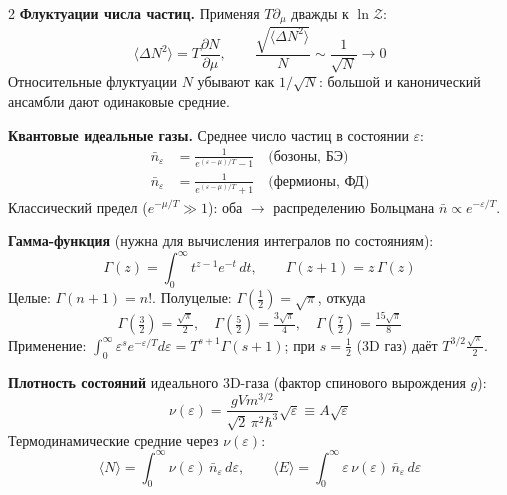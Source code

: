 \documentclass[a4paper,10pt]{article}
\begin{document}
\begin{multicols}{2}
\textbf{Флуктуации числа частиц.} Применяя $T\partial_\mu$ дважды к $\ln\mathcal{Z}$:
\begin{equation*}
    \langle\Delta N^2\rangle = T\frac{\partial N}{\partial\mu}, \qquad
    \frac{\sqrt{\langle\Delta N^2\rangle}}{N} \sim \frac{1}{\sqrt{N}} \to 0
\end{equation*}
Относительные флуктуации $N$ убывают как $1/\sqrt{N}$: большой и канонический ансамбли дают одинаковые средние.

\textbf{Квантовые идеальные газы.} Среднее число частиц в состоянии $\varepsilon$:
\begin{align*}
    \bar{n}_\varepsilon &= \frac{1}{e^{(\varepsilon-\mu)/T} - 1} \quad \text{(бозоны, БЭ)} \\[2pt]
    \bar{n}_\varepsilon &= \frac{1}{e^{(\varepsilon-\mu)/T} + 1} \quad \text{(фермионы, ФД)}
\end{align*}
Классический предел ($e^{-\mu/T} \gg 1$): оба $\to$ распределению Больцмана $\bar{n} \propto e^{-\varepsilon/T}$.

\textbf{Гамма-функция} (нужна для вычисления интегралов по состояниям):
\begin{equation*}
    \Gamma(z) = \int_0^\infty t^{z-1}e^{-t}\,dt, \qquad \Gamma(z+1) = z\,\Gamma(z)
\end{equation*}
Целые: $\Gamma(n+1)=n!$. Полуцелые: $\Gamma(\tfrac{1}{2})=\sqrt{\pi}$, откуда
\begin{equation*}
    \Gamma\!\left(\tfrac{3}{2}\right)=\tfrac{\sqrt{\pi}}{2},\quad
    \Gamma\!\left(\tfrac{5}{2}\right)=\tfrac{3\sqrt{\pi}}{4},\quad
    \Gamma\!\left(\tfrac{7}{2}\right)=\tfrac{15\sqrt{\pi}}{8}
\end{equation*}
Применение: $\displaystyle\int_0^\infty \varepsilon^s e^{-\varepsilon/T}d\varepsilon = T^{s+1}\Gamma(s+1)$; при $s=\tfrac{1}{2}$ (3D газ) даёт $T^{3/2}\tfrac{\sqrt{\pi}}{2}$.

\textbf{Плотность состояний} идеального 3D-газа (фактор спинового вырождения $g$):
\begin{equation*}
    \nu(\varepsilon) = \frac{gVm^{3/2}}{\sqrt{2}\,\pi^2\hbar^3}\sqrt{\varepsilon} \equiv A\sqrt{\varepsilon}
\end{equation*}
Термодинамические средние через $\nu(\varepsilon)$:
\begin{equation*}
    \langle N\rangle = \int_0^\infty \nu(\varepsilon)\,\bar{n}_\varepsilon\,d\varepsilon, \qquad
    \langle E\rangle = \int_0^\infty \varepsilon\,\nu(\varepsilon)\,\bar{n}_\varepsilon\,d\varepsilon
\end{equation*}


\end{multicols}
\end{document}
